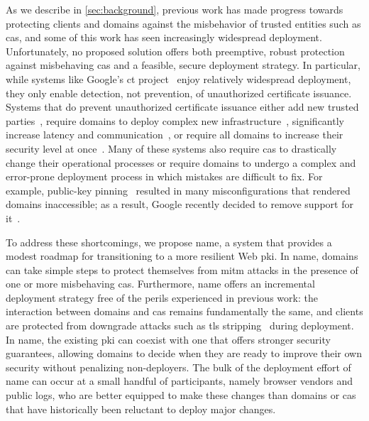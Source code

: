 As we describe in \autoref{sec:background}, previous work has made progress
towards protecting clients and domains against the misbehavior of trusted
entities such as \acp{ca}, and some of this work has seen increasingly
widespread deployment. Unfortunately, no proposed solution offers both
preemptive, robust protection against misbehaving \acp{ca} and a feasible,
secure deployment strategy. In particular, while systems like Google's \ac{ct}
project~\cite{rfc6962,ct-laurie} enjoy relatively widespread deployment, they only enable
detection, not prevention, of unauthorized certificate issuance. Systems that do
prevent unauthorized certificate issuance either add new trusted
parties~\cite{kim2013accountable}, require domains to deploy complex new
infrastructure~\cite{rfc6698, szalachowski2014policert}, significantly increase
latency and communication~\cite{yu2016dtki}, or require all domains to increase
their security level at once~\cite{basin2014arpki}. Many of these systems also
require \acp{ca} to drastically change their operational processes or require
domains to undergo a complex and error-prone deployment process in which
mistakes are difficult to fix. For example, public-key pinning~\cite{rfc7469,mid-air}
resulted in many misconfigurations that rendered domains inaccessible; as a result,
Google recently decided to remove support for it~\cite{palmer2017intent}.

To address these shortcomings, we propose \ac{name}, a system that provides a
modest roadmap for transitioning to a more resilient Web \ac{pki}. In \ac{name},
domains can take simple steps to protect themselves from \ac{mitm} attacks in
the presence of one or more misbehaving \acp{ca}. Furthermore, \ac{name} offers
an incremental  deployment strategy free of the perils experienced in previous
work: the interaction between domains and \acp{ca} remains fundamentally the
same, and clients are protected from downgrade attacks such as \ac{tls}
stripping~\cite{marlinspike2009new} during deployment. In \ac{name}, the
existing \ac{pki} can coexist with one that offers stronger security guarantees,
allowing domains to decide when they are ready to improve their own security
without penalizing non-deployers. The bulk of the deployment effort of \ac{name}
can occur at a small handful of participants, namely browser vendors and public
logs, who are better equipped to make these changes than domains or \acp{ca}
that have historically been reluctant to deploy major changes.

